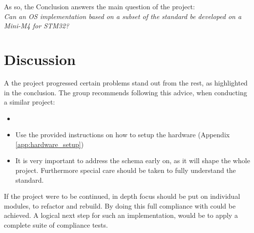 As so, the Conclusion answers the main question of the project:\\
\textit{Can an OS implementation based on a subset of the \arinc{} standard be
developed on a Mini-M4 for STM32?}
\clearpage


\section{Discussion}
A the project progressed certain problems stand out from the rest,
as highlighted in the conclusion.
The group recommends following this advice,
when conducting a similar project:

\begin{itemize}
	\item
	\item Use the provided instructions on how to setup the hardware (Appendix \ref{app:hardware_setup})
	\item It is very important to address the schema early on,
		as it will shape the whole project.
		Furthermore special care should be taken to fully understand the \arinc{} standard.
\end{itemize}

If the project were to be continued, in depth focus should be put on individual
modules, to refactor and rebuild.
By doing this full compliance with \arinc{} could be achieved.
A logical next step for such an implementation,
would be to apply a complete suite of compliance tests.


%
%


